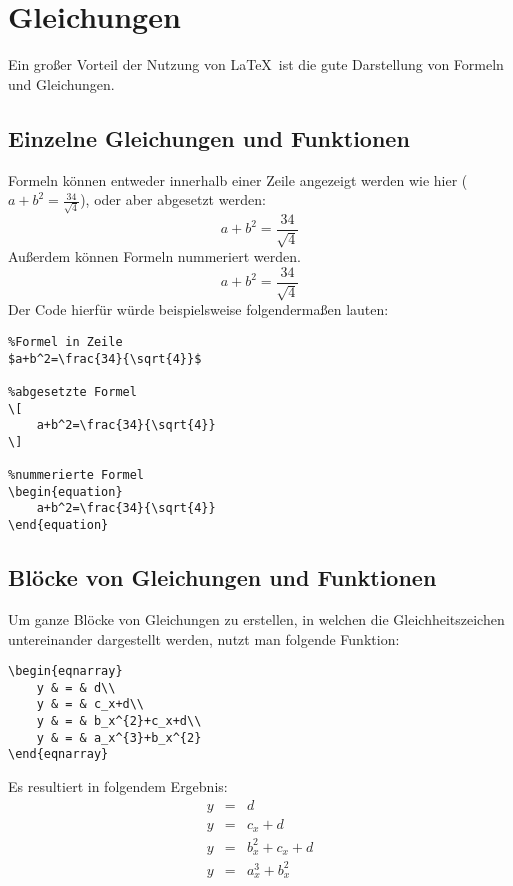 
\chapter{Gleichungen}
Ein großer Vorteil der Nutzung von \LaTeX\ ist die gute Darstellung von Formeln und Gleichungen. 
\section{Einzelne Gleichungen und Funktionen}
Formeln können entweder innerhalb einer Zeile angezeigt werden wie hier ($a+b^2=\frac{34}{\sqrt{4}}$), oder aber abgesetzt werden:
\[
    a+b^2=\frac{34}{\sqrt{4}}
\]
Außerdem können Formeln nummeriert werden.
\begin{equation}
    a+b^2=\frac{34}{\sqrt{4}}
\end{equation}
Der Code hierfür würde beispielsweise folgendermaßen lauten:
\begin{lstlisting}
%Formel in Zeile
$a+b^2=\frac{34}{\sqrt{4}}$

%abgesetzte Formel
\[
    a+b^2=\frac{34}{\sqrt{4}}
\]

%nummerierte Formel
\begin{equation}
    a+b^2=\frac{34}{\sqrt{4}}
\end{equation}
\end{lstlisting}

\section{Blöcke von Gleichungen und Funktionen}
Um ganze Blöcke von Gleichungen zu erstellen, in welchen die Gleichheitszeichen untereinander dargestellt werden, nutzt man folgende Funktion:

\begin{lstlisting}
\begin{eqnarray}
    y & = & d\\
    y & = & c_x+d\\
    y & = & b_x^{2}+c_x+d\\
    y & = & a_x^{3}+b_x^{2}
\end{eqnarray}
\end{lstlisting}
Es resultiert in folgendem Ergebnis:
\begin{eqnarray}
    y & = & d\\
    y & = & c_x+d\\
    y & = & b_x^{2}+c_x+d\\
    y & = & a_x^{3}+b_x^{2}
\end{eqnarray}

